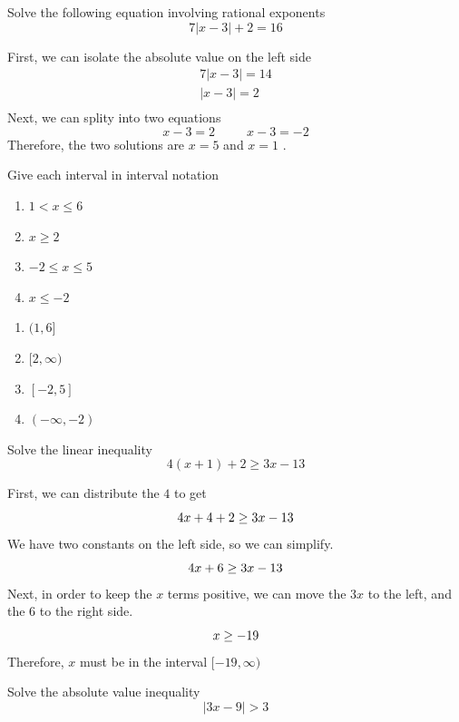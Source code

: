 \documentclass[addpoints,12pt]{exam}
\begin{document}
\begin{questions}
	 \question Solve the following equation involving rational exponents 
	    \[
	  7|x-3|+2=16
	 \]

\begin{solution}
    First, we can isolate the absolute value on the left side
		\begin{align*}
		    7|x-3| = 14 \\
				|x-3| = 2 \\
		\end{align*}
		Next, we can splity into two equations 
		\[
		x-3 = 2 \hspace{30pt} x-3 = -2 
		\]
		Therefore, the two solutions are $x =5 $ and $x = 1 $ . 
\end{solution}

\question Give each interval in interval notation 
\begin{enumerate}[label = \alph*)]
    \item $ 1 < x \leq 6$  
		\item $ x\geq 2  $
		\item $-2 \leq x \leq 5 $ 
		\item $x \leq -2 $ 
\end{enumerate}


\begin{solution}
\begin{enumerate}[label = \alph*)]
	\item $(1,6]$
	\item $[2,\infty)$
	\item $[-2,5]$
	\item $(-\infty,-2)$
\end{enumerate}
\end{solution}

\question Solve the linear inequality
   \[
4(x+1)+2\geq 3x-13
\]

\begin{solution}
    First, we can distribute the $4$ to get 
		\[
		4x + 4 +2  \geq 3x - 13 \\
		\]
		We have two constants on the left side, so we can simplify. 
		\[
		4x + 6 \geq 3x - 13 \\
		\]
		Next, in order to keep the $x$ terms positive, we can move the $3x$ to the left, and the $6$ to the right side. 
		\[
		x \geq -19  \\
		\]
	  Therefore, $x$ must be in the interval $[-19,\infty)$ 
\end{solution}

\question Solve the absolute value inequality 
\[
|3x-9| > 3
\]


\end{questions}
\end{document}
